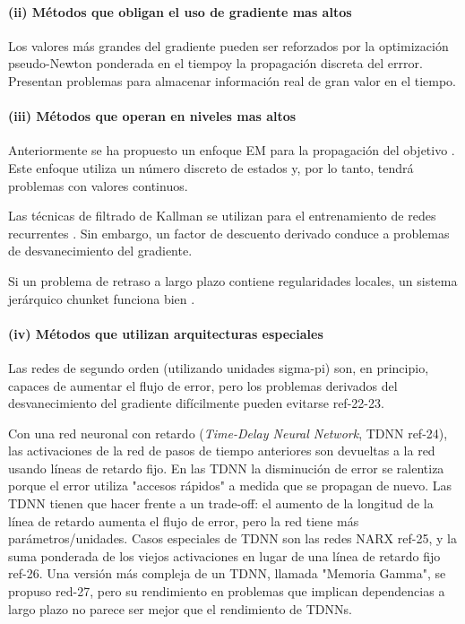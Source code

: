 \paragraph{(ii) Métodos que obligan el uso de gradiente mas altos} Los valores más grandes del gradiente pueden ser reforzados por la optimización pseudo-Newton ponderada en el tiempoy la propagación discreta del errror. Presentan problemas para almacenar información real de gran valor en el tiempo.

\paragraph{(iii) Métodos que operan en niveles mas altos} Anteriormente se ha propuesto un enfoque EM para la propagación del objetivo \cite{Bengio1993}. Este enfoque utiliza un número discreto de estados y, por lo tanto, tendrá problemas con valores continuos.

Las técnicas de filtrado de Kallman se utilizan para el entrenamiento de redes recurrentes \cite{Puskorius1994}. Sin embargo, un factor de descuento derivado conduce a problemas de desvanecimiento del gradiente.

Si un problema de retraso a largo plazo contiene regularidades locales, un sistema jerárquico chunket funciona bien \cite{Schmidhuber1992a}.

\paragraph{(iv) Métodos que utilizan arquitecturas especiales} Las redes de segundo orden (utilizando unidades sigma-pi) son, en principio, capaces de aumentar el flujo de error, pero los problemas derivados del desvanecimiento del gradiente difícilmente pueden evitarse ref-22-23.

Con una red neuronal con retardo ({\em Time-Delay Neural Network}, TDNN ref-24), las activaciones de la red de pasos de tiempo anteriores son devueltas a la red usando líneas de retardo fijo. En las TDNN la disminución de error se ralentiza porque el error utiliza "accesos rápidos" a medida que se propagan de nuevo. Las TDNN tienen que hacer frente a un trade-off: el aumento de la longitud de la línea de retardo aumenta el flujo de error, pero la red tiene más parámetros/unidades. Casos especiales de TDNN son las redes NARX ref-25, y la suma ponderada de los viejos activaciones en lugar de una línea de retardo fijo ref-26. Una versión más compleja de un TDNN, llamada "Memoria Gamma", se propuso red-27, pero su rendimiento en problemas que implican dependencias a largo plazo no parece ser mejor que el rendimiento de TDNNs.

